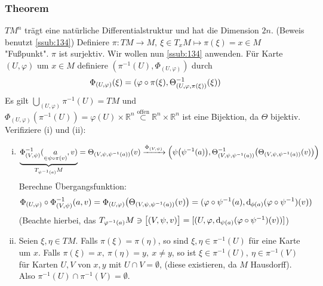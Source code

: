 \subsubsection{Theorem}
\label{ssub:133}
$TM^n$ trägt eine natürliche Differentialstruktur und hat die Dimension $2n$. (Beweis benutzt \ref{ssub:134})
Definiere $\pi: TM\to M,\ \xi \in T_x M \mapsto \pi(\xi) = x\in M$ "Fußpunkt". $\pi$ ist surjektiv. Wir wollen nun \ref{ssub:134} anwenden. Für Karte $(U,\varphi)$ um $x\in M$ definiere $(\pi^{-1}(U),\Phi_{(U,\varphi)})$ durch 
\[
\Phi_{(U,\varphi)} (\xi) = (\varphi \circ \pi(\xi),\Theta^{-1}_{(U,\varphi,\pi(\xi))}(\xi))
\]
Es gilt $\bigcup_{(U,\varphi)} \pi^{-1}(U) = TM$ und $\Phi_{(U,\varphi)}(\pi^{-1}(U)) = \varphi(U)\times \mathds{R}^n \overset{\text{offen}}{\subset} \mathds{R}^n\times \mathds{R}^n$ ist eine Bijektion, da $\Theta$ bijektiv.\\
Verifiziere (i) und (ii):
\begin{enumerate}[(i)]
\item 
\[
\underbrace{\Phi_{(V,\psi)}^{-1}(\underset{\in \psi\circ \pi(v)}{a},v)}_{T_{\psi^{-1}(a)} M} = \Theta_{(V,\psi,\psi ^{-1}(a))} (v) \xrightarrow{\Phi_{(V,\psi)}} \enbrace*{\psi\enbrace*{\psi^{-1}(a)}, \Theta^{-1}_{(V,\psi,\psi ^{-1}(a))}\enbrace*{\Theta_{(V,\psi,\psi ^{-1}(a))}(v)}}
\]
Berechne Übergangsfunktion:
\[
\Phi_{(U,\varphi)} \circ \Phi_{(V,\psi)}^{-1} (a,v) = \Phi_{(U,\varphi)}\enbrace*{\Theta_{(V,\psi,\psi ^{-1}(a))} (v)} = \enbrace{\varphi \circ \psi^{-1} (a), \mathd_{\phi(a)}(\varphi \circ \psi^{-1})(v)}
\]
(Beachte hierbei, das $T_{\varphi^{-1}(a)}M \ni \big[(V,\psi,v)\big] = [(U,\varphi,\mathrm{d}\mkern-1.0mu_{\psi(a)}(\varphi \circ \psi^{-1})(v))]$)
\item Seien $\xi,\eta \in TM$. Falls $\pi(\xi) = \pi(\eta)$, so sind $\xi,\eta \in \pi^{-1}(U)$ für eine Karte um $x$. Falls $\pi(\xi) = x,\ \pi(\eta) = y,\ x\neq y$, so ist $\xi \in \pi^{-1}(U),\ \eta \in \pi^{-1}(V)$ für Karten $U,V$ von $x, y$ mit $U\cap V = \emptyset$, (diese existieren, da $M$ Hausdorff). Also $\pi^{-1}(U)\cap \pi^{-1}(V) = \emptyset$.
\end{enumerate}

